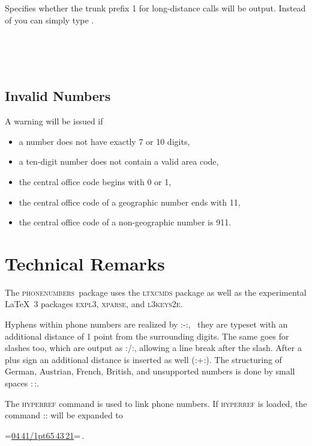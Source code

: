 \documentclass[numbers=noenddot]{scrreprt}
\newcommand*{\Paket}[1]{\textsc{#1}}
\newcommand{\phone}{\textcolor{cnltx}{\Paket{phone\-numbers}}}
\newcommand{\UeberschriftUngueltig}{\section{Invalid Numbers}}
\newcommand{\WarnungWenn}{A warning will be issued if}
\begin{document}
\begin{Befehlsliste}
Specifies whether the trunk prefix 1 for long-distance calls will be output. Instead of  you can simply type .
\begin{sidebyside}
   \\
   \\
   \\
\end{sidebyside}
\end{Befehlsliste}


\UeberschriftUngueltig
\WarnungWenn
\begin{itemize}
\item a number does not have exactly 7 or 10 digits,
\item a ten-digit number does not contain a valid area code,
\item the central office code begins with 0 or 1,
\item the central office code of a geographic number ends with 11,
\item the central office code of a non-geographic number is 911.
\end{itemize}

\chapter{Technical Remarks}
The \phone\ package uses the
\Paket{ltxcmds} 
package as well as the experimental \LaTeX\ 3 packages
\Paket{expl3}, \Paket{xparse}, and \Paket{l3keys2e}.

Hyphens within phone numbers are realized by
\verbcode:\kern1pt-\kern1pt:, \ie\ they are typeset with an additional distance of 1 point from the surrounding digits. The same goes for slashes too, which are output as
\verbcode:\kern1pt\slash\kern1pt:, allowing a line break after the slash. After a plus sign an additional distance is inserted as well
(\verbcode:+\kern1pt:).
The structuring of German, Austrian, French, British, and unsupported numbers is done by small spaces
\verbcode:\,:.

The \Paket{hyperref} command  is used to link phone numbers. If \Paket{hyperref} is loaded, the command
\verbcode::
will be expanded to
\begin{center}
\verbcode=\href{tel:+49441654321}{04\,41\kern1pt\slash\kern1pt65\,43\,21}=\,.
\end{center}
\end{document}
